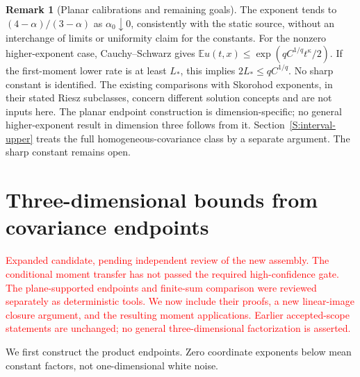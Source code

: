 \documentclass[12pt]{article}
\numberwithin{equation}{section}
\theoremstyle{definition}
\newtheorem{remark}[theorem]{Remark}
\newcommand{\E}{\mathbb{E}}
\newcommand{\myCmts}[1]{\begin{framed}\noindent\textcolor{red}{#1}\end{framed}}
\begin{document}
\begin{remark}[Planar calibrations and remaining goals]\label{R:planar-scope}
  The exponent tends to $(4-\alpha)/(3-\alpha)$ as
  $\alpha_0\downarrow0$, consistently with the static source, without
  an interchange of limits or uniformity claim for the constants.
  For the nonzero higher-exponent case, Cauchy--Schwarz gives
  $\E u(t,x)\le\exp(qC^{1/q}t^\kappa/2)$.
  If the first-moment lower rate is at least $L_*$, this implies
  $2L_*\le qC^{1/q}$. No sharp constant is identified. The existing
  comparisons with Skorohod exponents, in their stated Riesz subclasses,
  concern different solution concepts and are not inputs here. The planar
  endpoint construction
  is dimension-specific; no general higher-exponent result in dimension
  three follows from it. Section~\ref{S:interval-upper} treats the full
  homogeneous-covariance class by a separate argument. The sharp
  constant remains open.
\end{remark}

\section{Three-dimensional bounds from covariance endpoints}
\label{S:three-endpoints}

\myCmts{Expanded candidate, pending independent review of the new assembly.
The conditional moment transfer has not passed the required high-confidence
gate. The plane-supported endpoints and finite-sum comparison were reviewed
separately as deterministic tools. We now include their proofs, a new
linear-image closure argument, and the resulting moment applications.
Earlier accepted-scope statements are unchanged; no general
three-dimensional factorization is asserted.}

We first construct the product endpoints. Zero coordinate exponents below
mean constant factors, not one-dimensional white noise.
\end{document}
